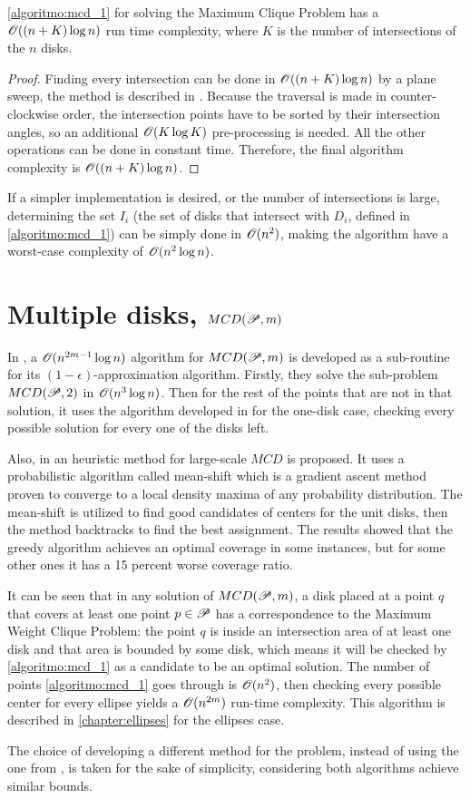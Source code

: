 \begin{teorema}\label{lema:disk}
\autoref{algoritmo:mcd_1} for solving the Maximum Clique Problem has a $\mathscr{O}((n+K)\log{n})$ run time complexity, where $K$ is the number of intersections of the $n$ disks.
\end{teorema}

\begin{proof}
    Finding every intersection can be done in $\mathscr{O}((n+K)\log{n})$  by a plane sweep, the method is described in . 
    Because the traversal is made in counter-clockwise order, the intersection points have to be sorted by their intersection angles, so an additional $\mathscr{O}(K\log{K})$ pre-processing is needed. All the other operations can be done in constant time. Therefore, the final algorithm complexity is $\mathscr{O}((n+K)\log{n})$.
\end{proof}

If a simpler implementation is desired, or the number of intersections is large, determining the set $I_i$ (the set of disks that intersect with $D_i$, defined in \autoref{algoritmo:mcd_1}) can be simply done in $\mathscr{O}(n^2)$, making the algorithm have a worst-case complexity of $\mathscr{O}(n^2\log{n})$.

\section{Multiple disks, $MCD(\mathscr{P}, m)$}


In \cite{cabello:2006}, a $\mathscr{O}(n^{2m-1}\log{n})$ algorithm for $MCD(\mathscr{P}, m)$ is developed as a sub-routine for its $(1-\epsilon)$-approximation algorithm. Firstly, they solve the sub-problem $MCD(\mathscr{P}, 2)$ in $\mathscr{O}(n^3\log{n})$. Then for the rest of the points that are not in that solution, it uses the algorithm developed in \cite{chazelle:1986} for the one-disk case, checking every possible solution for every one of the disks left.

Also, in \cite{zhou} an heuristic method for large-scale $MCD$ is proposed. It uses a probabilistic algorithm called mean-shift which is a gradient ascent method proven to converge to a local density maxima of any probability distribution. The mean-shift is utilized to find good candidates of centers for the unit disks, then the method backtracks to find the best assignment. The results showed that the greedy algorithm achieves an optimal coverage in some instances, but for some other ones it has a 15 percent worse coverage ratio.
 
It can be seen that in any solution of $MCD(\mathscr{P}, m)$, a disk placed at a point $q$ that covers at least one point $p \in \mathscr{P}$ has a correspondence to the Maximum Weight Clique Problem: the point $q$ is inside an intersection area of at least one disk and that area is bounded by some disk, which means it will be checked by \autoref{algoritmo:mcd_1} as a candidate to be an optimal solution. The number of points \autoref{algoritmo:mcd_1} goes through is $\mathscr{O}(n^2)$, then checking every possible center for every ellipse yields a $\mathscr{O}(n^{2m})$ run-time complexity.
This algorithm is described in \autoref{chapter:ellipses} for the ellipses case.

The choice of developing a different method for the problem, instead of using the one from \cite{cabello:2006}, is taken for the sake of simplicity, considering both algorithms achieve similar bounds.